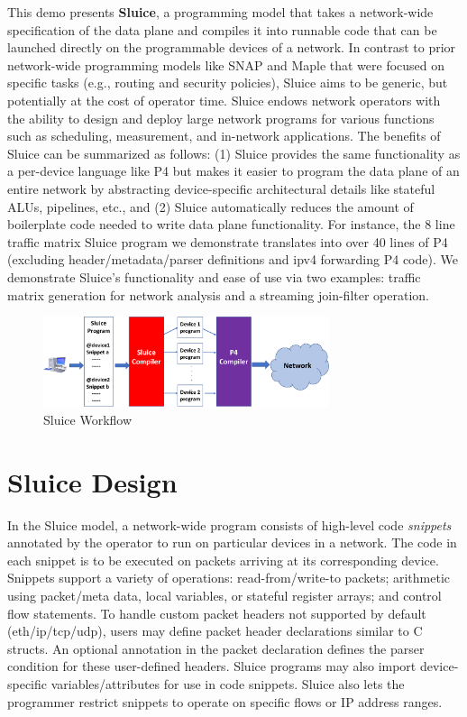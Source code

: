 This demo presents \textbf{Sluice}, a programming model that takes a
network-wide specification of the data plane and compiles it into runnable code
that can be launched directly on the programmable devices of a network. In
contrast to prior network-wide programming models like SNAP and Maple that were
focused on specific tasks (e.g., routing and security policies), Sluice aims to
be generic, but potentially at the cost of operator time.
Sluice endows network operators with the ability to design and deploy large
network programs for various functions such as scheduling, measurement, and in-network applications.  The benefits of Sluice can be summarized as follows: (1) Sluice provides the same functionality as a per-device language like P4 but makes it easier to program the data plane of an entire network by abstracting device-specific architectural details like stateful ALUs, pipelines, etc., and (2) Sluice automatically reduces the amount of boilerplate code needed to write data plane functionality. For instance, the 8 line traffic matrix Sluice program we demonstrate translates into over 40 lines of P4 (excluding header/metadata/parser definitions and ipv4 forwarding P4 code). We demonstrate Sluice's functionality and ease of use via two examples: traffic matrix generation for network analysis and a streaming join-filter operation.
\begin{figure}[tp]
\centering
\includegraphics[width=84mm,scale=0.7]{figures/sluice_workflow.pdf}
\caption{Sluice Workflow}
\vspace{-10mm}
\end{figure}
\vspace{-4mm}

\section{Sluice Design}
In the Sluice model, a network-wide program consists of high-level code
\textit{snippets} annotated by the operator to run on particular devices in a
network. The code in each snippet is to be executed on packets arriving at its corresponding device. Snippets support a variety of operations:
read-from/write-to packets; arithmetic using packet/meta data, local variables, or
stateful register arrays; and control flow statements. To handle custom packet headers not supported by default (eth/ip/tcp/udp), users may
define packet header declarations similar to C structs. An optional annotation in the packet declaration defines the parser condition for these user-defined headers. Sluice programs may also import
device-specific variables/attributes for use in code snippets. Sluice also lets
the programmer restrict snippets to operate on specific flows or IP address
ranges.

